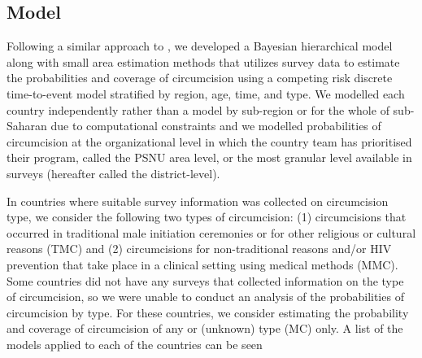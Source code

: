 \documentclass{article}
\begin{document}
\begin{appendix}
\section{Model}


Following a similar approach to \cite{thomas2024substantial}, we developed a Bayesian hierarchical model along with small area estimation methods that utilizes survey data to estimate the probabilities and coverage of circumcision using a competing risk discrete time-to-event model stratified by region, age, time, and type. We modelled each country independently rather than a model by sub-region or for the whole of sub-Saharan due to computational constraints and we modelled probabilities of circumcision at the organizational level in which the country team has prioritised their program, called the PSNU area level, or the most granular level available in surveys (hereafter called the district-level). 

In countries where suitable survey information was collected on circumcision type, we consider the following two types of circumcision: (1) circumcisions that occurred in traditional male initiation ceremonies or for other religious or cultural reasons (TMC) and (2) circumcisions for non-traditional reasons and/or HIV prevention that take place in a clinical setting using medical methods (MMC). Some countries did not have any surveys that collected information on the type of circumcision, so we were unable to conduct an analysis of the probabilities of circumcision by type. For these countries, we consider estimating the probability and coverage of circumcision of any or (unknown) type (MC) only. A list of the models applied to each of the countries can be seen



\end{appendix}
\end{document}
